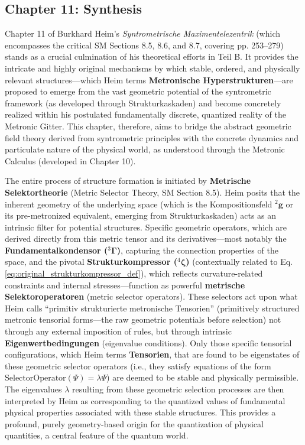 \documentclass[12pt]{article}
\newcommand{\q}[1]{\enquote{#1}}
\newcommand{\kompositionsfeld}{{}^2\mathbf{g}}
\newcommand{\fundamentalkondensor}{{}^3\bm{\Gamma}}
\newcommand{\strukturkompressor}{{}^4\bm{\zeta}}
\begin{document}
\subsection{Chapter 11: Synthesis}
\label{sec:chapter11_synthesis}

Chapter 11 of Burkhard Heim's \textit{Syntrometrische Maximentelezentrik} (which encompasses the critical SM Sections 8.5, 8.6, and 8.7, covering pp. 253–279) stands as a crucial culmination of his theoretical efforts in Teil B. It provides the intricate and highly original mechanisms by which stable, ordered, and physically relevant structures—which Heim terms \textbf{Metronische Hyperstrukturen}—are proposed to emerge from the vast geometric potential of the syntrometric framework (as developed through Strukturkaskaden) and become concretely realized within his postulated fundamentally discrete, quantized reality of the Metronic Gitter. This chapter, therefore, aims to bridge the abstract geometric field theory derived from syntrometric principles with the concrete dynamics and particulate nature of the physical world, as understood through the Metronic Calculus (developed in Chapter 10).

The entire process of structure formation is initiated by \textbf{Metrische Selektortheorie} (Metric Selector Theory, SM Section 8.5). Heim posits that the inherent geometry of the underlying space (which is the Kompositionsfeld \( \kompositionsfeld \) or its pre-metronized equivalent, emerging from Strukturkaskaden) acts as an intrinsic filter for potential structures. Specific geometric operators, which are derived directly from this metric tensor and its derivatives—most notably the \textbf{Fundamentalkondensor (\( \fundamentalkondensor \))}, capturing the connection properties of the space, and the pivotal \textbf{Strukturkompressor (\( \strukturkompressor \))} (contextually related to Eq. \eqref{eq:original_strukturkompressor_def}), which reflects curvature-related constraints and internal stresses—function as powerful \textbf{metrische Selektoroperatoren} (metric selector operators). These selectors act upon what Heim calls \q{primitiv strukturierte metronische Tensorien} (primitively structured metronic tensorial forms—the raw geometric potentials before selection) not through any external imposition of rules, but through intrinsic \textbf{Eigenwertbedingungen} (eigenvalue conditions). Only those specific tensorial configurations, which Heim terms \textbf{Tensorien}, that are found to be eigenstates of these geometric selector operators (i.e., they satisfy equations of the form \( \text{SelectorOperator}(\Psi) = \lambda\Psi \)) are deemed to be stable and physically permissible. The eigenvalues \( \lambda \) resulting from these geometric selection processes are then interpreted by Heim as corresponding to the quantized values of fundamental physical properties associated with these stable structures. This provides a profound, purely geometry-based origin for the quantization of physical quantities, a central feature of the quantum world.
\end{document}
